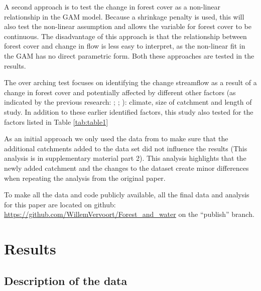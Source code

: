 \documentclass[]{elsarticle} %
\begin{document}
A second approach is to test the change in forest cover as a non-linear relationship in the GAM model. Because a shrinkage penalty is used, this will also test the non-linear assumption and allows the variable for forest cover to be continuous. The disadvantage of this approach is that the relationship between forest cover and change in flow is less easy to interpret, as the non-linear fit in the GAM has no direct parametric form.
Both these approaches are tested in the results.

The over arching test focuses on identifying the change streamflow as a result of a change in forest cover and potentially affected by different other factors (as indicated by the previous research: \citet{zhang2017}; \citet{filoso2017}; \citet{zhou2015}): climate, size of catchment and length of study. In addition to these earlier identified factors, this study also tested for the factors listed in Table \ref{tab:table1}

As an initial approach we only used the data from \citet{zhang2017} to make sure that the additional catchments added to the data set did not influence the results (This analysis is in supplementary material part 2). This analysis highlights that the newly added catchment and the changes to the dataset create minor differences when repeating the analysis from the original paper.

To make all the data and code publicly available, all the final data and analysis for this paper are located on github:\\
\href{https://github.com/WillemVervoort/Forest_and_water/tree/publish}{https://github.com/WillemVervoort/Forest\_and\_water} on the ``publish'' branch.

\hypertarget{results}{%
\section{Results}\label{results}}

\hypertarget{description-of-the-data}{%
\subsection{Description of the data}\label{description-of-the-data}}
\end{document}
